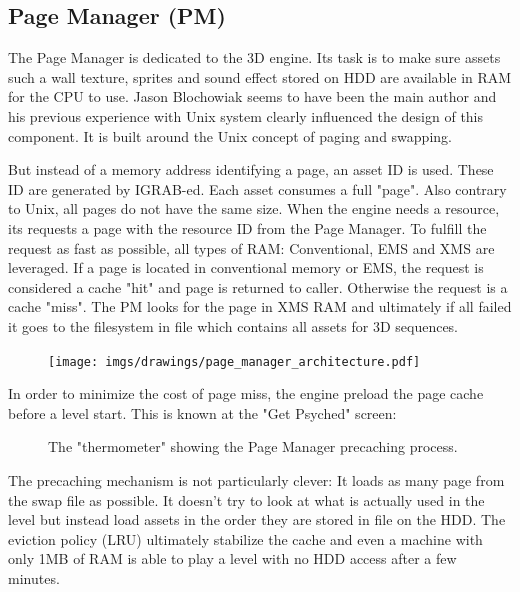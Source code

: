 \documentclass[book.tex]{subfiles}
\begin{document}
\subsection{Page Manager (PM)}
The Page Manager is dedicated to the 3D engine. Its task is to make sure assets such a wall texture, sprites and sound effect stored on HDD are available in RAM for the CPU to use. Jason Blochowiak seems to have been the main author and his previous experience with Unix system clearly influenced the design of this component. It is built around the Unix concept of paging and swapping. \\
\par
But instead of a memory address identifying a page, an asset ID is used. These ID are generated by IGRAB-ed. Each asset consumes a full "page". Also contrary to Unix, all pages do not have the same size. When the engine needs a resource, its requests a page with the resource ID from the Page Manager. To fulfill the request as fast as possible, all types of RAM: Conventional, EMS and XMS are leveraged. If a page is located in conventional memory or EMS, the request is considered a cache "hit" and page is returned to caller. Otherwise the request is a cache "miss". The PM looks for the page in XMS RAM and ultimately if all failed it goes to the filesystem in file  which contains all assets for 3D sequences.\\
 \par
\begin{figure}[H]
\centering
 \texttt{[image: imgs/drawings/page\_manager\_architecture.pdf]}
 \end{figure}
 \par
In order to minimize the cost of page miss, the engine preload the page cache before a level start. This is known at the "Get Psyched" screen:
 \par
\begin{figure}[H]
\centering
 \caption{The "thermometer" showing the Page Manager precaching process.}
 \end{figure}
 \par
The precaching mechanism is not particularly clever: It loads as many page from the swap file as possible. It doesn't try to look at what is actually used in the level but instead load assets in the order they are stored in  file on the HDD. The eviction policy (LRU) ultimately stabilize the cache and even a machine with only 1MB of RAM is able to play a level with no HDD access after a few minutes.\\
\end{document}
